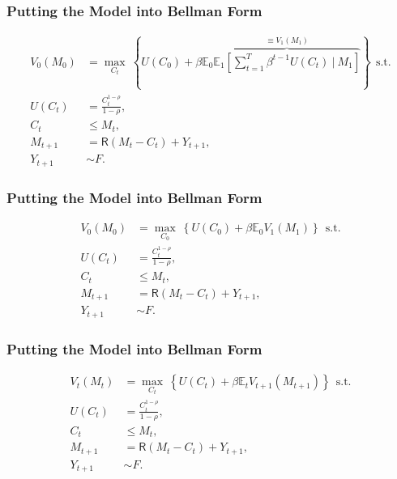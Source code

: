 \documentclass[aspectratio=169]{beamer}
\newcommand{\E}{\mathbb{E}}
\begin{document}
\begin{frame}
\frametitle{Putting the Model into Bellman Form}

\begin{align*}
V_0(M_0) &= \max_{C_t} ~ \left\{ U(C_0) + \beta \E_0 \overbrace{\E_1 \left[ \sum_{t=1}^T \beta^{t-1} U(C_t) ~\bigg|~ M_1 \right]}^{\equiv V_1(M_1)} \right\} ~~\text{s.t.} \\
U(C_t) &= \frac{C_t^{1-\rho}}{1-\rho}, \\
C_t &\leq M_t, \\
M_{t+1} &= \mathsf{R} (M_t - C_t) + Y_{t+1}, \\
Y_{t+1} &\sim F.
\end{align*}
\end{frame}


\begin{frame}
\frametitle{Putting the Model into Bellman Form}

\begin{align*}
V_0(M_0) &= \max_{C_0} ~ \left\{ U(C_0) + \beta \E_0 V_1(M_1) \right\} ~~\text{s.t.} \\
U(C_t) &= \frac{C_t^{1-\rho}}{1-\rho}, \\
C_t &\leq M_t, \\
M_{t+1} &= \mathsf{R} (M_t - C_t) + Y_{t+1}, \\
Y_{t+1} &\sim F.
\end{align*}
\end{frame}


\begin{frame}
\frametitle{Putting the Model into Bellman Form}

\begin{align*}
V_t(M_t) &= \max_{C_t} ~ \left\{ U(C_t) + \beta \E_t V_{t+1}(M_{t+1}) \right\} ~~\text{s.t.} \\
U(C_t) &= \frac{C_t^{1-\rho}}{1-\rho}, \\
C_t &\leq M_t, \\
M_{t+1} &= \mathsf{R} (M_t - C_t) + Y_{t+1}, \\
Y_{t+1} &\sim F.
\end{align*}
\end{frame}


\end{document}
